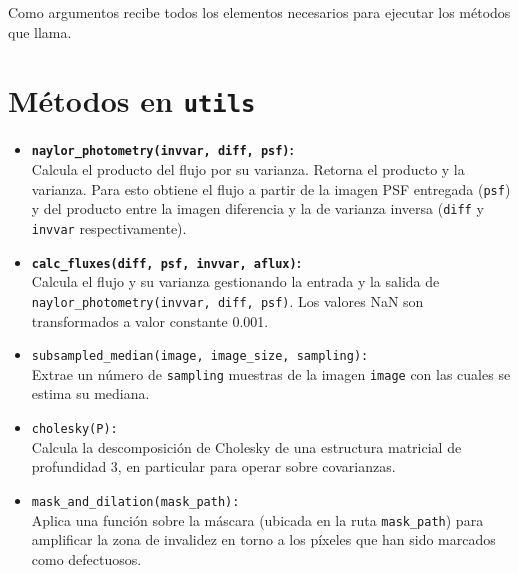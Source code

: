 \begin{appendix}
\begin{itemize}
Como argumentos recibe todos los elementos necesarios para ejecutar los m\'etodos que llama.

\end{itemize}
\pagebreak

\section{M\'etodos en \texttt{utils}}
\label{ap:utils}
\begin{itemize}
\item \textbf{\texttt{naylor\_photometry(invvar, diff, psf)}:}\\
Calcula el producto del flujo por su varianza. Retorna el producto y la varianza. Para esto obtiene el flujo a partir de la imagen PSF entregada (\texttt{psf}) y del producto entre la imagen diferencia y la de varianza inversa (\texttt{diff} y \texttt{invvar} respectivamente)\cite{naylor}.
\bigskip


\item \textbf{\texttt{calc\_fluxes(diff, psf, invvar, aflux)}:}\\
Calcula el flujo y su varianza gestionando la entrada y la salida de \texttt{naylor\_photometry(invvar, diff, psf)}. Los valores NaN son transformados a valor constante 0.001.
\bigskip

\item \texttt{subsampled\_median(image, image\_size, sampling):}\\
Extrae un n\'umero de \texttt{sampling} muestras de la imagen \texttt{image} con las cuales se estima su mediana. 
\bigskip

\item \texttt{cholesky(P):}\\
Calcula la descomposici\'on de Cholesky de una estructura matricial de profundidad 3, en particular para operar sobre covarianzas.
\bigskip

\item \texttt{mask\_and\_dilation(mask\_path):}\\
Aplica una funci\'on sobre la m\'ascara (ubicada en la ruta \texttt{mask\_path}) para amplificar la zona de invalidez en torno a los p\'ixeles que han sido marcados como defectuosos.
\bigskip

\end{itemize} 
\pagebreak


\end{appendix}
